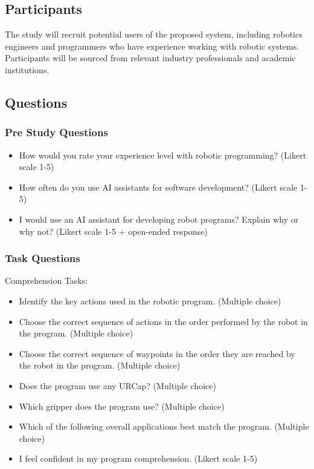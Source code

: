 \subsection{Participants}
The study will recruit potential users of the proposed system, including robotics engineers and programmers who have experience working with robotic systems. Participants will be sourced from relevant industry professionals and academic institutions.


\subsection{Questions}
\subsubsection{Pre Study Questions}
\begin{itemize}
    \item How would you rate your experience level with robotic programming? (Likert scale 1-5)
    \item How often do you use AI assistants for software development? (Likert scale 1-5)
    \item I would use an AI assistant for developing robot programs? Explain why or why not? (Likert scale 1-5 + open-ended response)
\end{itemize}

\subsubsection{Task Questions}
Comprehension Tasks:
\begin{itemize}
    \item Identify the key actions used in the robotic program. (Multiple choice)
    \item Choose the correct sequence of actions in the order performed by the robot in the program. (Multiple choice)
    \item Choose the correct sequence of waypoints in the order they are reached by the robot in the program. (Multiple choice)
    \item Does the program use any URCap? (Multiple choice)
    \item Which gripper does the program use? (Multiple choice)
    \item Which of the following overall applications best match the program. (Multiple choice)
    \item I feel confident in my program comprehension. (Likert scale 1-5)
\end{itemize}

